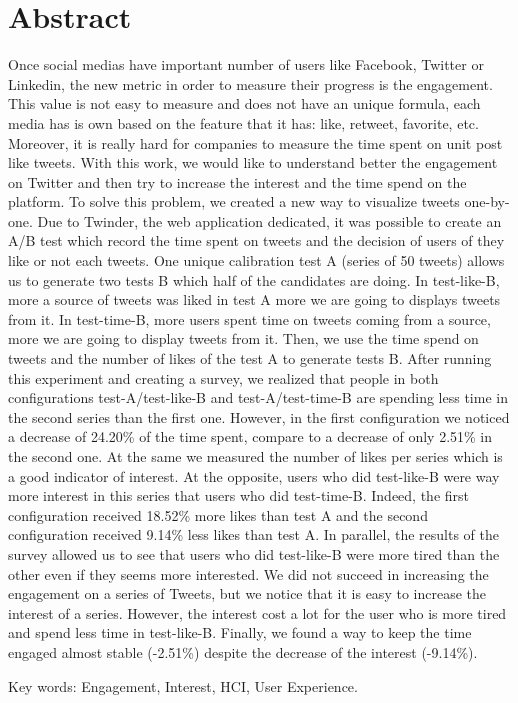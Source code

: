 


\cleardoublepage
\chapter*{Abstract}

Once social medias have important number of users like Facebook, Twitter or Linkedin, the new metric in order to measure their progress is the engagement. This value is not easy to measure and does not have an unique formula, each media has is own based on the feature that it has: like, retweet, favorite, etc. Moreover, it is really hard for companies to measure the time spent on unit post like tweets.
With this work, we would like to understand better the engagement on Twitter and then try to increase the interest and the time spend on the platform.
To solve this problem, we created a new way to visualize tweets one-by-one. Due to Twinder, the web application dedicated, it was possible to create an A/B test which record the time spent on tweets and the decision of users of they like or not each tweets.
One unique calibration test A (series of 50 tweets) allows us to generate two tests B which half of the candidates are doing. In test-like-B, more a source of tweets was liked in test A more we are going to displays tweets from it. In test-time-B, more users spent time on tweets coming from a source, more we are going to display tweets from it. Then, we use the time spend on tweets and the number of likes of the test A to generate tests B.
After running this experiment and creating a survey, we realized that people in both configurations test-A/test-like-B and test-A/test-time-B are spending less time in the second series than the first one. However, in the first configuration we noticed a decrease of 24.20\% of the time spent, compare to a decrease of only 2.51\% in the second one. At the same we measured the number of likes per series which is a good indicator of interest. At the opposite, users who did test-like-B were way more interest in this series that users who did test-time-B. Indeed, the first configuration received 18.52\% more likes than test A and the second configuration received 9.14\% less likes than test A. In parallel, the results of the survey allowed us to see that users who did test-like-B were more tired than the other even if they seems more interested.
We did not succeed in increasing the engagement on a series of Tweets, but we notice that it is easy to increase the interest of a series. However, the interest cost a lot for the user who is more tired and spend less time in test-like-B. Finally, we found a way to keep the time engaged almost stable (-2.51\%) despite the decrease of the interest (-9.14\%).

\vskip0.5cm
Key words: Engagement, Interest, HCI, User Experience.
